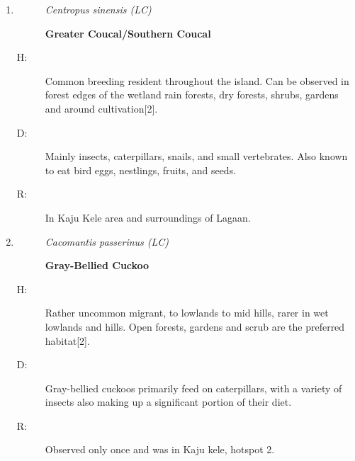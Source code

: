 \begin{itemize}
\begin{enumerate}
\begin{description}
\item[]%
\textbf{Asian Koel/Western Koel}%
\end{description}%
\begin{description}%
\item[H: ]%
Common breeding resident from lowland to mid hills. Forests, open woodlands, gardens, and cultivation are the habitats that mostly preferred{[}2{]}.%
\item[D: ]%
Has a diverse diet that includes insects, caterpillars and small vertebrates. However, adults primarily sustain themselves by consuming fruits%
\item[R: ]%
Throughout the university. Common in Kaju Kele and boat yard area.%
\end{description}%
\item%
\begin{description}%
\item[]%
\textit{Centropus sinensis (LC)}%
\item[]%
\textbf{Greater Coucal/Southern Coucal}%
\end{description}%
\begin{description}%
\item[H: ]%
Common breeding resident throughout the island. Can be observed in forest edges of the wetland rain forests, dry forests, shrubs, gardens and around cultivation{[}2{]}.%
\item[D: ]%
Mainly insects, caterpillars, snails, and small vertebrates. Also known to eat bird eggs, nestlings, fruits, and seeds.%
\item[R: ]%
In Kaju Kele area and surroundings of Lagaan.%
\end{description}%
\item%
\begin{description}%
\item[]%
\textit{Cacomantis passerinus (LC)}%
\item[]%
\textbf{Gray{-}Bellied Cuckoo}%
\end{description}%
\begin{description}%
\item[H: ]%
Rather uncommon migrant, to lowlands to mid hills, rarer in wet lowlands and hills. Open forests, gardens and scrub are the preferred habitat{[}2{]}.%
\item[D: ]%
Gray{-}bellied cuckoos primarily feed on caterpillars, with a variety of insects also making up a significant portion of their diet.%
\item[R: ]%
Observed only once and was in Kaju kele, hotspot 2.%

\end{description}
\end{enumerate}
\end{itemize}
